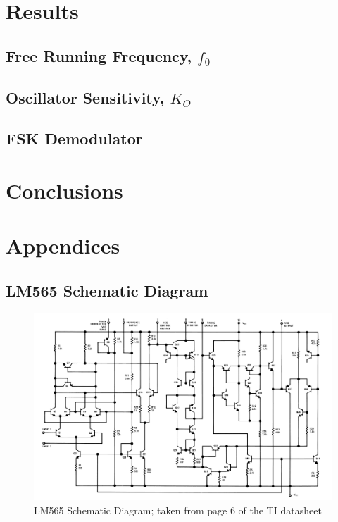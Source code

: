 \documentclass[titlepage, letterpaper, 10.5pt]{article}
\begin{document}
\section{Results}

\subsection{Free Running Frequency, $f_{0}$}

\subsection{Oscillator Sensitivity, $K_{O}$}

\subsection{FSK Demodulator}

\section{Conclusions}

\section{Appendices}

\clearpage
\subsection{LM565 Schematic Diagram}
\label{lm565-schematic-diagram}

\begin{figure}[ht]
	\centering
	\includegraphics[width=1\textwidth]{diagrams/lm565-equivalent-circuit}
	\caption{LM565 Schematic Diagram; taken from page 6 of the TI datasheet}
	\label{lm565-equivalent-circuit}
\end{figure}
\end{document}
